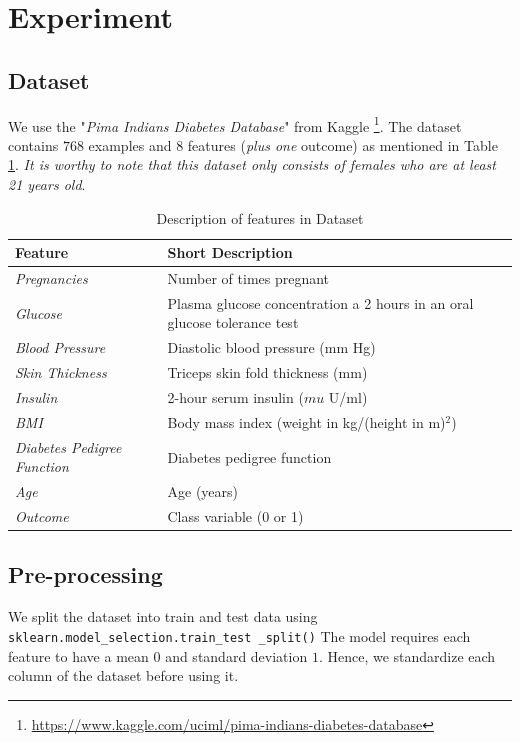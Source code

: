 \documentclass[11pt,a4paper]{article}
\begin{document}
\section{Experiment}
\subsection{Dataset}
We use the "\textit{Pima Indians Diabetes Database}" from Kaggle \footnote{\url{https://www.kaggle.com/uciml/pima-indians-diabetes-database}}. The dataset contains $768$ examples and $8$ features (\textit{plus one} outcome) as mentioned in Table \ref{tab:dataset-desc}. {\em It is worthy to note that this dataset only consists of females who are at least 21 years old}.

\begin{table}[h]
\centering
\begin{tabular}{| p{2cm} | p{4.7cm}|}
\hline \textbf{Feature} & \textbf{Short Description} \\ \hline
{\em Pregnancies} & Number of times pregnant \\ \hline
{\em Glucose} & Plasma glucose concentration a 2 hours in an oral glucose tolerance test \\ \hline
{\em Blood Pressure} & Diastolic blood pressure (mm Hg) \\ \hline
{\em Skin Thickness} & Triceps skin fold thickness (mm) \\ \hline
{\em Insulin} & 2-hour serum insulin ($mu$ U/ml) \\ \hline
{\em BMI}& Body mass index (weight in kg/(height in m)$^2$) \\ \hline
{\em Diabetes Pedigree Function} & Diabetes pedigree function \\ \hline
{\em Age} & Age (years) \\ \hline
{\em Outcome} & Class variable (0 or 1) \\ 
\hline
\end{tabular}
\caption{\label{tab:dataset-desc} Description of features in Dataset}
\end{table}

\subsection{Pre-processing}
\label{sec:process}
We split the dataset into train and test data using \texttt{ sklearn.model\_selection.train\_test \_split()} The model requires each feature to have a mean $0$ and standard deviation $1$. Hence, we standardize each column of the dataset before using it.
\end{document}
